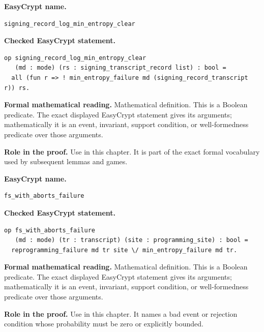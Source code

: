 \begin{formaldefinition}
\noindent\textbf{EasyCrypt name.}
\begin{lstlisting}[language=EasyCrypt,basicstyle=\ttfamily\scriptsize]
signing_record_log_min_entropy_clear
\end{lstlisting}
\noindent\textbf{Checked EasyCrypt statement.}
\begin{lstlisting}[language=EasyCrypt,basicstyle=\ttfamily\scriptsize]
op signing_record_log_min_entropy_clear
   (md : mode) (rs : signing_transcript_record list) : bool =
  all (fun r => ! min_entropy_failure md (signing_record_transcript r)) rs.
\end{lstlisting}
\noindent\textbf{Formal mathematical reading.}
Mathematical definition. This is a Boolean predicate.  The exact displayed EasyCrypt statement gives its arguments; mathematically it is an event, invariant, support condition, or well-formedness predicate over those arguments.

\noindent\textbf{Role in the proof.}
Use in this chapter. It is part of the exact formal vocabulary used by subsequent lemmas and games.

\end{formaldefinition}

\begin{formaldefinition}
\noindent\textbf{EasyCrypt name.}
\begin{lstlisting}[language=EasyCrypt,basicstyle=\ttfamily\scriptsize]
fs_with_aborts_failure
\end{lstlisting}
\noindent\textbf{Checked EasyCrypt statement.}
\begin{lstlisting}[language=EasyCrypt,basicstyle=\ttfamily\scriptsize]
op fs_with_aborts_failure
   (md : mode) (tr : transcript) (site : programming_site) : bool =
  reprogramming_failure md tr site \/ min_entropy_failure md tr.
\end{lstlisting}
\noindent\textbf{Formal mathematical reading.}
Mathematical definition. This is a Boolean predicate.  The exact displayed EasyCrypt statement gives its arguments; mathematically it is an event, invariant, support condition, or well-formedness predicate over those arguments.

\noindent\textbf{Role in the proof.}
Use in this chapter. It names a bad event or rejection condition whose probability must be zero or explicitly bounded.

\end{formaldefinition}

